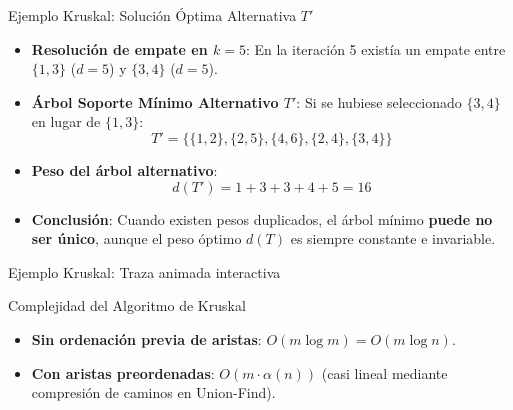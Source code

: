 \documentclass[
  ignorenonframetext,
]{beamer}
\providecommand{\tightlist}{%
  \setlength{\itemsep}{0pt}\setlength{\parskip}{0pt}}
\begin{document}
\begin{frame}{Ejemplo Kruskal: Solución Óptima Alternativa \(T'\)}
\label{ejemplo-kruskal-soluciuxf3n-uxf3ptima-alternativa-t}
\begin{itemize}
\item
  \textbf{Resolución de empate en \(k=5\)}: En la iteración 5 existía un
  empate entre \(\{1, 3\}\) (\(d=5\)) y \(\{3, 4\}\) (\(d=5\)).
\item
  \textbf{Árbol Soporte Mínimo Alternativo \(T'\)}: Si se hubiese
  seleccionado \(\{3, 4\}\) en lugar de \(\{1, 3\}\): \[
  T' = \{\{1, 2\}, \{2, 5\}, \{4, 6\}, \{2, 4\}, \{3, 4\}\}
  \]
\item
  \textbf{Peso del árbol alternativo}:
  \[d(T') = 1 + 3 + 3 + 4 + 5 = 16\]
\item
  \textbf{Conclusión}: Cuando existen pesos duplicados, el árbol mínimo
  \textbf{puede no ser único}, aunque el peso óptimo \(d(T)\) es siempre
  constante e invariable.
\end{itemize}
\end{frame}

\begin{frame}{Ejemplo Kruskal: Traza animada interactiva}
\label{ejemplo-kruskal-traza-animada-interactiva}
\end{frame}

\begin{frame}{Complejidad del Algoritmo de Kruskal}
\label{complejidad-del-algoritmo-de-kruskal}
\begin{tcolorbox}[enhanced jigsaw, left=2mm, opacityback=0, titlerule=0mm, breakable, toptitle=1mm, rightrule=.15mm, bottomtitle=1mm, coltitle=black, title=\textcolor{quarto-callout-note-color}{\faInfo}\hspace{0.5em}{Complejidad computacional de Kruskal}, colframe=quarto-callout-note-color-frame, colbacktitle=quarto-callout-note-color!10!white, arc=.35mm, toprule=.15mm, leftrule=.75mm, bottomrule=.15mm, opacitybacktitle=0.6, colback=white]

\begin{itemize}
\tightlist
\item
  \textbf{Sin ordenación previa de aristas}:
  \(O(m \log m) = O(m \log n)\).
\item
  \textbf{Con aristas preordenadas}: \(O(m \cdot \alpha(n))\) (casi
  lineal mediante compresión de caminos en Union-Find).
\end{itemize}

\end{tcolorbox}
\end{frame}
\end{document}

